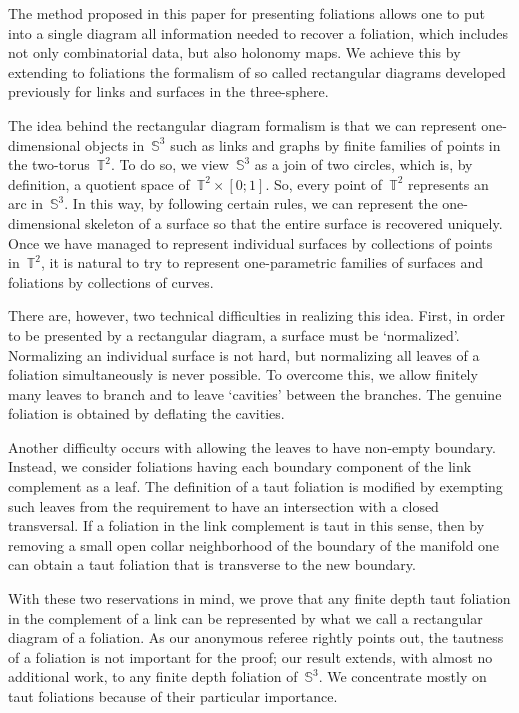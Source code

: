 \documentclass{amsart}
\theoremstyle{theorem}
\theoremstyle{remark}
\theoremstyle{definition}
\numberwithin{equation}{section}
\numberwithin{figure}{section}
\begin{document}
The method proposed in this paper for presenting foliations allows one
to put into a single diagram all information needed to recover a foliation,
which includes not only combinatorial data, but also
holonomy maps. We achieve this by extending to foliations the formalism
of so called rectangular diagrams developed previously for links and surfaces in the
three-sphere.

The idea behind the rectangular diagram formalism is that we can represent
one-dimensional objects in~$\mathbb S^3$ such as links and graphs by
finite families of points in the two-torus~$\mathbb T^2$.
To do so, we view~$\mathbb S^3$ as a join of two circles, which is, by definition,
a quotient space of~$\mathbb T^2\times[0;1]$. So, every point of~$\mathbb T^2$
represents an arc in~$\mathbb S^3$. In this way, by following certain rules,
we can represent the one-dimensional skeleton of a surface so that the entire
surface is recovered uniquely. Once we have managed to represent individual
surfaces by collections of points in~$\mathbb T^2$, it is natural to try to represent
one-parametric families of surfaces and foliations by collections of curves.

There are, however, two technical difficulties in realizing this idea. First,
in order to be presented by a rectangular diagram, a surface must be `normalized'.
Normalizing an individual surface is not hard, but normalizing all leaves
of a foliation simultaneously is never possible. To overcome this, we allow finitely many leaves
to branch and to leave `cavities' between the branches. The genuine foliation
is obtained by deflating the cavities.

Another difficulty occurs with allowing the leaves to have non-empty boundary. Instead,
we consider foliations having each boundary component of the link complement as a leaf.
The definition of a taut foliation is modified by exempting such leaves from the requirement to
have an intersection with a closed transversal. If a foliation in the link complement
is taut in this sense, then by removing a small open collar neighborhood of the boundary
of the manifold one can obtain a taut foliation that is transverse to the new boundary.

With these two reservations in mind, we prove that any
finite depth taut foliation in the complement of a link
can be represented by what we call a rectangular diagram of a foliation.
As our anonymous referee rightly points out, the tautness of a foliation is not important
for the proof; our result extends, with almost no additional work, to any finite depth foliation of~$\mathbb S^3$.
We concentrate mostly on taut foliations because of their particular importance.
\end{document}

